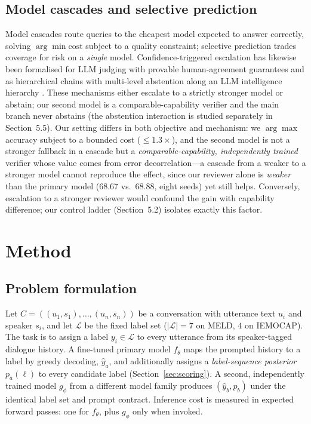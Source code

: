 \documentclass[final,5p,times,twocolumn]{elsarticle}
\begin{document}
\subsection{Model cascades and selective prediction}
\label{sec:cascade}
Model cascades \citep{chen2023frugalgpt,ong2024routellm} route queries to the cheapest model
expected to answer correctly, solving $\arg\min \text{cost}$ subject to a
quality constraint; selective prediction \citep{geifman2017selective,el2010foundations} trades
coverage for risk on a \emph{single} model. Confidence-triggered escalation
has likewise been formalised for LLM judging with provable human-agreement
guarantees \citep{jung2024trust} and as hierarchical chains with multi-level
abstention along an LLM intelligence hierarchy \citep{zellinger2024hcma}.
These mechanisms either escalate to a strictly stronger model or abstain;
our second model is a comparable-capability verifier and the main branch
never abstains (the abstention interaction is studied separately in
Section~5.5). Our setting differs in both
objective and mechanism: we $\arg\max$ accuracy subject to a bounded cost
($\leq 1.3\times$), and the second model is not a stronger fallback in a
cascade but a \emph{comparable-capability, independently trained} verifier
whose value comes from error decorrelation---a cascade from a weaker to a
stronger model cannot reproduce the effect, since our reviewer alone is
\emph{weaker} than the primary model (68.67 vs.\ 68.88, eight seeds) yet still helps.
Conversely, escalation to a stronger reviewer would confound the gain with
capability difference; our control ladder (Section~5.2) isolates exactly
this factor.

\section{Method}
\label{sec:method}
\subsection{Problem formulation}
\label{sec:formulation}
Let $C=((u_1,s_1),\ldots,(u_n,s_n))$ be a conversation with utterance text
$u_i$ and speaker $s_i$, and let $\mathcal{L}$ be the fixed label set
($|\mathcal{L}|{=}7$ on MELD, $4$ on IEMOCAP). The task is to assign a label
$y_i\in\mathcal{L}$ to every utterance from its speaker-tagged dialogue
history. A fine-tuned primary model $f_\theta$ maps the prompted history to a
label by greedy decoding, $\hat y_a$, and additionally assigns a
\emph{label-sequence posterior} $p_a(\ell)$ to every candidate label
(Section~\ref{sec:scoring}). A second, independently trained model
$g_\phi$ from a different model family produces $(\hat y_b,p_b)$ under the
identical label set and prompt contract. Inference cost is measured in
expected forward passes: one for $f_\theta$, plus $g_\phi$ only when
invoked.
\end{document}
